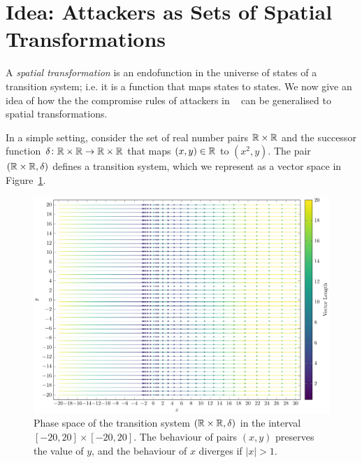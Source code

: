 \section{Idea: Attackers as Sets of Spatial Transformations}
A \emph{spatial transformation} is an endofunction in the universe of states of a transition system; i.e. it is a function that maps states to states. We now give an idea of how the the compromise rules of attackers in ~\cite{KnowYourEnemy} can be generalised to spatial transformations. 

In a simple setting, consider the set of real number pairs $\mathbb{R}\times\mathbb{R}$ and the successor function $\delta\colon \mathbb{R}\times\mathbb{R}\rightarrow \mathbb{R}\times\mathbb{R}$ that maps $(x,y)\in \mathbb{R}$ to $(x^2,y)$. The pair $(\mathbb{R}\times\mathbb{R}, \delta)$ defines a transition system, which we represent as a vector space in Figure~\ref{fig:IntroVectorSpace}.
\begin{figure}[t]
    \centering
    \includegraphics[width=\textwidth]{Figures/VectorSpace1.pdf} 
    \caption{Phase space of the transition system $(\mathbb{R}\times\mathbb{R}, \delta)$ in the interval $[-20,20]\times[-20,20]$. The behaviour of pairs $(x,y)$ preserves the value of $y$, and the behaviour of $x$ diverges if $|x|>1$.}
    \label{fig:IntroVectorSpace}
  \end{figure}
